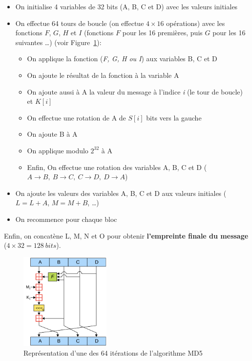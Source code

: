 \documentclass[12pt, a4paper]{article}
\begin{document}
\begin{itemize}
    \item On initialise 4 variables de 32 bits (A, B, C et D) avec les valeurs initiales
    \item On effectue 64 tours de boucle (on effectue $4 \times 16$ opérations) avec les fonctions $F$, $G$, $H$ et $I$
    (fonctions $F$ pour les 16 premières, puis $G$ pour les 16 suivantes \ldots) (voir Figure~\ref{md5_algo}):
    \begin{itemize}[label={\textbullet}]
        \item On applique la fonction (\textit{F, G, H ou I}) aux variables B, C et D
        \item On ajoute le résultat de la fonction à la variable A
        \item On ajoute aussi à A la valeur du message à l'indice \textit{i} (le tour de boucle) et $K[i]$
        \item On effectue une rotation de A de $S[i]$ bits vers la gauche
        \item On ajoute B à A
        \item On applique modulo $2^{32}$ à A
        \item Enfin, On effectue une rotation des variables A, B, C et D ($A \rightarrow B, \ B \rightarrow C, \ C \rightarrow D, \ D \rightarrow A$)
    \end{itemize}
    \item On ajoute les valeurs des variables A, B, C et D aux valeurs initiales ($L = L + A$, $M = M + B$, \ldots)
    \item On recommence pour chaque bloc
\end{itemize}
\bigskip
Enfin, on concatène L, M, N et O pour obtenir \textbf{l'empreinte finale du message} ($4 \times 32 = 128 \ bits$).
\bigskip
\begin{figure}[ht]
    \centering
    \includegraphics[width=0.4\textwidth]{../annexes/md5_algo.png}
    \caption{Représentation d'une des 64 itérations de l'algorithme MD5}\label{md5_algo}
\end{figure}
\end{document}
